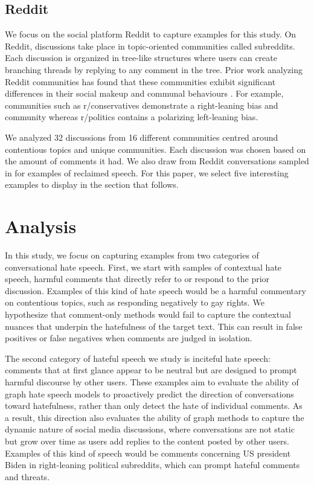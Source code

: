 \documentclass[letterpaper]{article} %
\begin{document}
\subsection{Reddit}
We focus on the social platform Reddit to capture examples for this study. On Reddit, discussions take place in topic-oriented communities called subreddits. Each discussion is organized in tree-like structures where users can create branching threads by replying to any comment in the tree. Prior work analyzing Reddit communities has found that these communities exhibit significant differences in their social makeup and communal behaviours \cite{Waller2021}. For example, communities such as r/conservatives demonstrate a right-leaning bias and community whereas r/politics contains a polarizing left-leaning bias.

We analyzed 32 discussions from 16 different communities centred around contentious topics and unique communities. Each discussion was chosen based on the amount of comments it had. We also draw from Reddit conversations sampled in \citet{kurrek2020towards} for examples of reclaimed speech. For this paper, we select five interesting examples to display in the section that follows.


\section{Analysis}
In this study, we focus on capturing examples from two categories of conversational hate speech. First, we start with samples of contextual hate speech, harmful comments that directly refer to or respond to the prior discussion. Examples of this kind of hate speech would be a harmful commentary on contentious topics, such as responding negatively to gay rights. We hypothesize that comment-only methods would fail to capture the contextual nuances that underpin the hatefulness of the target text. This can result in false positives or false negatives when comments are judged in isolation.

The second category of hateful speech we study is inciteful hate speech: comments that at first glance appear to be neutral but are designed to prompt harmful discourse by other users. These examples aim to evaluate the ability of graph hate speech models to proactively predict the direction of conversations toward hatefulness, rather than only detect the hate of individual comments. As a result, this direction also evaluates the ability of graph methods to capture the dynamic nature of social media discussions, where conversations are not static but grow over time as users add replies to the content posted by other users. Examples of this kind of speech would be comments concerning US president Biden in right-leaning political subreddits, which can prompt hateful comments and threats.
\end{document}
